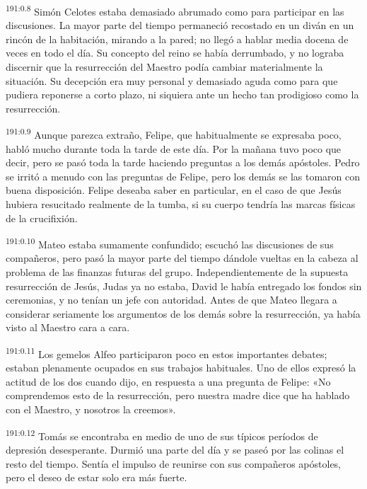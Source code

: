 \par 
\textsuperscript{191:0.8} Simón Celotes estaba demasiado abrumado como para participar en las discusiones. La mayor parte del tiempo permaneció recostado en un diván en un rincón de la habitación, mirando a la pared; no llegó a hablar media docena de veces en todo el día. Su concepto del reino se había derrumbado, y no lograba discernir que la resurrección del Maestro podía cambiar materialmente la situación. Su decepción era muy personal y demasiado aguda como para que pudiera reponerse a corto plazo, ni siquiera ante un hecho tan prodigioso como la resurrección.

\par 
\textsuperscript{191:0.9} Aunque parezca extraño, Felipe, que habitualmente se expresaba poco, habló mucho durante toda la tarde de este día. Por la mañana tuvo poco que decir, pero se pasó toda la tarde haciendo preguntas a los demás apóstoles. Pedro se irritó a menudo con las preguntas de Felipe, pero los demás se las tomaron con buena disposición. Felipe deseaba saber en particular, en el caso de que Jesús hubiera resucitado realmente de la tumba, si su cuerpo tendría las marcas físicas de la crucifixión.

\par 
\textsuperscript{191:0.10} Mateo estaba sumamente confundido; escuchó las discusiones de sus compañeros, pero pasó la mayor parte del tiempo dándole vueltas en la cabeza al problema de las finanzas futuras del grupo. Independientemente de la supuesta resurrección de Jesús, Judas ya no estaba, David le había entregado los fondos sin ceremonias, y no tenían un jefe con autoridad. Antes de que Mateo llegara a considerar seriamente los argumentos de los demás sobre la resurrección, ya había visto al Maestro cara a cara.

\par 
\textsuperscript{191:0.11} Los gemelos Alfeo participaron poco en estos importantes debates; estaban plenamente ocupados en sus trabajos habituales. Uno de ellos expresó la actitud de los dos cuando dijo, en respuesta a una pregunta de Felipe: «No comprendemos esto de la resurrección, pero nuestra madre dice que ha hablado con el Maestro, y nosotros la creemos».

\par 
\textsuperscript{191:0.12} Tomás se encontraba en medio de uno de sus típicos períodos de depresión desesperante. Durmió una parte del día y se paseó por las colinas el resto del tiempo. Sentía el impulso de reunirse con sus compañeros apóstoles, pero el deseo de estar solo era más fuerte.

